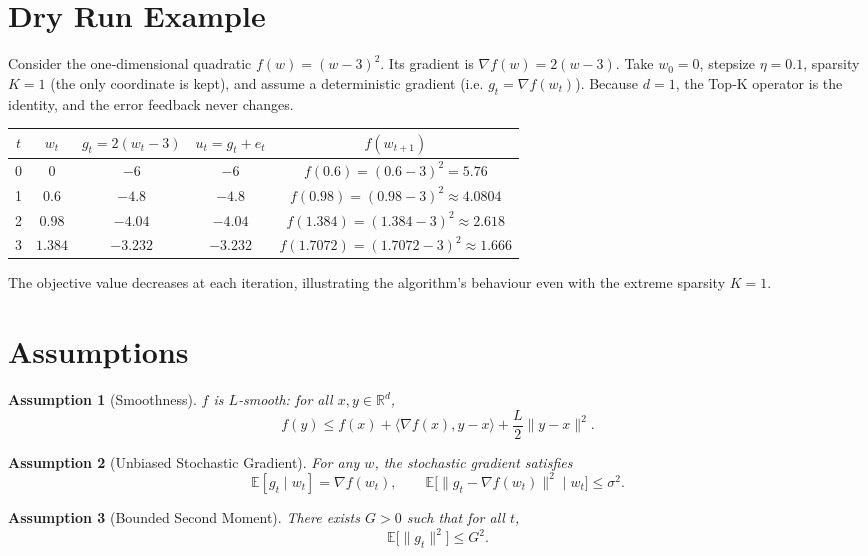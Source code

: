 \documentclass{article}
\newtheorem{assumption}{Assumption}
\newcommand{\E}{\mathbb{E}}
\begin{document}
\section*{Dry Run Example}
Consider the one‑dimensional quadratic $f(w)=(w-3)^2$.  
Its gradient is $\nabla f(w)=2(w-3)$.  
Take $w_0=0$, stepsize $\eta=0.1$, sparsity $K=1$ (the only coordinate is kept), and assume a deterministic gradient (i.e. $g_t=\nabla f(w_t)$).  
Because $d=1$, the Top‑K operator is the identity, and the error feedback never changes.

\begin{center}
\begin{tabular}{c|c|c|c|c}
$t$ & $w_t$ & $g_t=2(w_t-3)$ & $u_t=g_t+e_t$ & $f(w_{t+1})$\\\midrule
0 & $0$   & $-6$ & $-6$ & $f(0.6)= (0.6-3)^2 =5.76$\\
1 & $0.6$ & $-4.8$ & $-4.8$ & $f(0.98)= (0.98-3)^2 \approx 4.0804$\\
2 & $0.98$& $-4.04$& $-4.04$ & $f(1.384)= (1.384-3)^2 \approx 2.618$\\
3 & $1.384$& $-3.232$& $-3.232$ & $f(1.7072)= (1.7072-3)^2 \approx 1.666$\\
\end{tabular}
\end{center}
The objective value decreases at each iteration, illustrating the algorithm’s behaviour even with the extreme sparsity $K=1$.

\newpage
\section*{Assumptions}
\begin{assumption}[Smoothness]\label{as:smooth}
$f$ is $L$‑smooth: for all $x,y\in\mathbb{R}^d$,
\[
    f(y)\le f(x)+\langle\nabla f(x),y-x\rangle+\frac{L}{2}\|y-x\|^2 .
\]
\end{assumption}

\begin{assumption}[Unbiased Stochastic Gradient]\label{as:unbiased}
For any $w$, the stochastic gradient satisfies
\[
    \E[g_t\mid w_t]=\nabla f(w_t), \qquad
    \E\big[\|g_t-\nabla f(w_t)\|^2\mid w_t\big]\le\sigma^2 .
\]
\end{assumption}

\begin{assumption}[Bounded Second Moment]\label{as:bounded}
There exists $G>0$ such that for all $t$,
\[
    \E\big[\|g_t\|^2\big]\le G^2 .
\]
\end{assumption}
\end{document}
